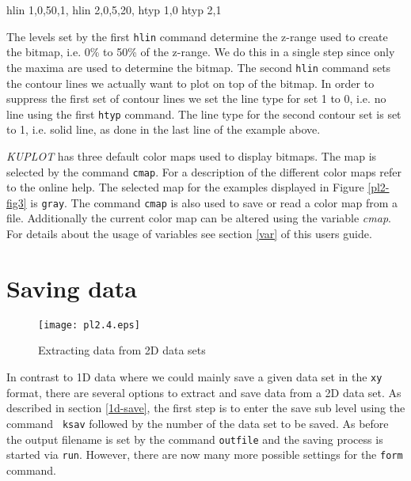 \begin{MacVerbatim}
    hlin 1,0,50,1,%
    hlin 2,0,5,20,%
    htyp 1,0
    htyp 2,1
\end{MacVerbatim}

The levels set by the first {\tt hlin} command determine the z-range
used to create the bitmap, i.e. 0\% to 50\% of the z-range. We do
this in a single step since only the maxima are used to determine
the bitmap. The second {\tt hlin} command sets the contour lines we
actually want to plot on top of the bitmap. In order to suppress the
first set of contour lines we set the line type for set 1 to 0, i.e.
no line using the first {\tt htyp} command. The line type for the
second contour set is set to 1, i.e. solid line, as done in the last
line of the example above. \par

{\it KUPLOT} has three default color maps used to display bitmaps.
The map is selected by the command {\tt cmap}. For a description of
the different color maps refer to the online help. The selected map
for the examples displayed in Figure \ref{pl2-fig3} is {\tt gray}.
The command {\tt cmap} is also used to save or read a color map from
a file. Additionally the current color map can be altered using the
variable {\it cmap}. For details about the usage of variables see
section \ref{var} of this users guide.


\section{Saving data \label{2d-save}}

\begin{figure}[!t]
   \centering
   \texttt{[image: pl2.4.eps]}
   \caption{Extracting data from 2D data sets}
   \label{pl2-fig4}
\end{figure}

In contrast to 1D data where we could mainly save a given data set
in the {\tt xy} format, there are several options to extract and
save data from a 2D data set. As described in section \ref{1d-save},
the first step is to enter the save sub level using the command {\tt
ksav} followed by the number of the data set to be saved. As before
the output filename is set by the command {\tt outfile} and the
saving process is started via {\tt run}. However, there are now many
more possible settings for the {\tt form} command.

